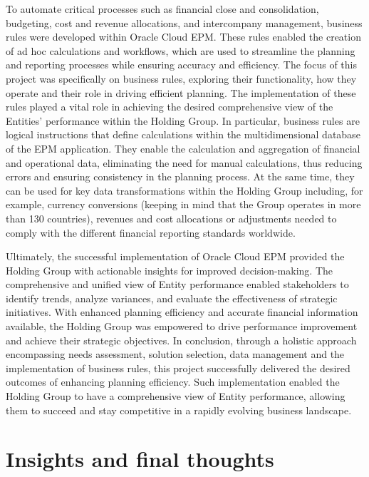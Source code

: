 \documentclass[12pt,a4paper,openright,twoside]{book}
\begin{document}
To automate critical processes such as financial close and consolidation, budgeting, cost and revenue allocations, and intercompany management, business rules were developed within Oracle Cloud EPM. 
%
These rules enabled the creation of ad hoc calculations and workflows, which are used to streamline the planning and reporting processes while ensuring accuracy and efficiency.
%
The focus of this project was specifically on business rules, exploring their functionality, how they operate and their role in driving efficient planning. 
%
The implementation of these rules played a vital role in achieving the desired comprehensive view of the Entities' performance within the Holding Group.
%
In particular, business rules are logical instructions that define calculations within the multidimensional database of the EPM application. 
%
They enable the calculation and aggregation of financial and operational data, eliminating the need for manual calculations, thus reducing errors and ensuring consistency in the planning process.
%
At the same time, they can be used for key data transformations within the Holding Group including, for example, currency conversions (keeping in mind that the Group operates in more than 130 countries), revenues and cost allocations or adjustments needed to comply with the different financial reporting standards worldwide. 

Ultimately, the successful implementation of Oracle Cloud EPM provided the Holding Group with actionable insights for improved decision-making. 
%
The comprehensive and unified view of Entity performance enabled stakeholders to identify trends, analyze variances, and evaluate the effectiveness of strategic initiatives. 
%
With enhanced planning efficiency and accurate financial information available, the Holding Group was empowered to drive performance improvement and achieve their strategic objectives.
%
In conclusion, through a holistic approach encompassing needs assessment, solution selection, data management and the implementation of business rules, this project successfully delivered the desired outcomes of enhancing planning efficiency.
%
Such implementation enabled the Holding Group to have a comprehensive view of Entity performance, allowing them to succeed and stay competitive in a rapidly evolving business landscape.

\section{Insights and final thoughts}
\end{document}
